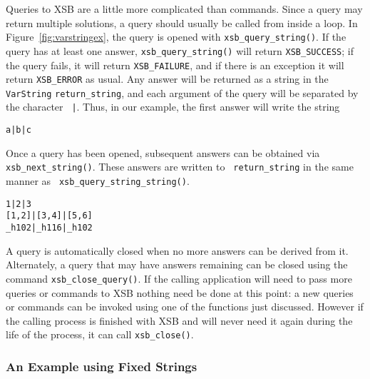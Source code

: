 Queries to XSB are a little more complicated than commands.  Since a
query may return multiple solutions, a query should usually be called
from inside a loop.  In Figure~\ref{fig:varstringex}, the query is
opened with {\tt xsb\_query\_string()}.  If the query has at least one
answer, {\tt xsb\_query\_string()} will return {\tt XSB\_SUCCESS}; if
the query fails, it will return {\tt XSB\_FAILURE}, and if there is an
exception it will return {\tt XSB\_ERROR} as usual.  Any answer will
be returned as a string in the {\tt VarString} {\tt return\_string},
and each argument of the query will be separated by the character {\tt
  |}.  Thus, in our example, the first answer will write the string
%
\begin{small}
\begin{verbatim}
a|b|c
\end{verbatim}
\end{small}
% 
Once a query has been opened, subsequent answers can be obtained via
{\tt xsb\_next\_string()}.  These answers are written to {\tt
  return\_string} in the same manner as {\tt
  xsb\_query\_string\_string()}.
%
\begin{small}
\begin{verbatim}
1|2|3
[1,2]|[3,4]|[5,6]
_h102|_h116|_h102
\end{verbatim}
\end{small}
%
A query is automatically closed when no more answers can be derived
from it.  Alternately, a query that may have answers remaining can be
closed using the command {\tt xsb\_close\_query()}.  If the calling
application will need to pass more queries or commands to XSB nothing
need be done at this point: a new queries or commands can be invoked
using one of the functions just discussed.  However if the calling
process is finished with XSB and will never need it again during the
life of the process, it can call {\tt xsb\_close()}.

\subsubsection{An Example using Fixed Strings}

